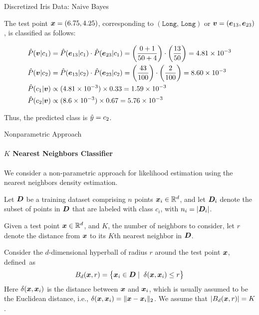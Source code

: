 \begin{frame}{Discretized Iris Data: Naive Bayes}

    The test point ${\boldsymbol x}=(6.75,4.25)$, corresponding to
    $(\texttt{Long, Long})$ or ${\boldsymbol v} = ({\boldsymbol e}_{13}, {\boldsymbol e}_{23})$,
    is classif\/{i}ed as follows:

    \begin{align*}
        \hat{P}({\boldsymbol v}|c_1) & = \hat{P}({\boldsymbol e}_{13}|c_1)\cdot \hat{P}({\boldsymbol e}_{23}|c_1)
        = \left({0+1\over 50+4}\right) \cdot \left({13 \over 50}\right) = 4.81
        \times 10^{-3}\\
        \hat{P}({\boldsymbol v}|c_2) & = \hat{P}({\boldsymbol e}_{13}|c_2)\cdot \hat{P}({\boldsymbol e}_{23}|c_2)
        = \left({43\over 100}\right) \cdot \left({2 \over 100}\right) = 8.60
        \times 10^{-3}\\
        \hat{P}(c_1|{\boldsymbol v}) & \propto (4.81 \times 10^{-3}) \times 0.33 =
        1.59 \times 10^{-3}\\
        \hat{P}(c_2|{\boldsymbol v}) & \propto (8.6 \times 10^{-3}) \times 0.67 =
        5.76 \times 10^{-3}
    \end{align*}

    Thus, the predicted class is $\hat{y} = c_2$.

\end{frame}


\begin{frame}{Nonparametric Approach}
\framesubtitle{$K$ Nearest Neighbors Classif\/{i}er}

We consider a
non-parametric approach for likelihood estimation 
using the nearest neighbors density estimation.

\medskip
Let ${\boldsymbol D}$ be a training dataset comprising $n$ points ${\boldsymbol x}_i \in
{\mathord{\mathbb R}}^d$, and let ${\boldsymbol D}_i$ denote the subset of points in ${\boldsymbol D}$ that are
labeled with class $c_i$, with $n_i = |{\boldsymbol D}_i|$.  

\medskip
Given a test point ${\boldsymbol x}
\in {\mathord{\mathbb R}}^d$, and $K$, the number of neighbors to consider, let $r$
denote the distance from ${\boldsymbol x}$ to its $K$th nearest neighbor in ${\boldsymbol D}$.

\medskip
Consider the $d$-dimensional hyperball of radius $r$ around the test
point ${\boldsymbol x}$, def\/{i}ned~as
\begin{align*}
  B_d({\boldsymbol x},r) = \bigl\{{\boldsymbol x}_i \in {\boldsymbol D} \mid
  \;\delta({\boldsymbol x},{\boldsymbol x}_i) \leq r\bigr\}
\end{align*}
Here $\delta({\boldsymbol x}, {\boldsymbol x}_i)$ is the distance between ${\boldsymbol x}$ and ${\boldsymbol x}_i$,
which is usually assumed to be the Euclidean distance, i.e., $\delta({\boldsymbol x},
{\boldsymbol x}_i) = \|{\boldsymbol x} - {\boldsymbol x}_i \|_2$.  We assume that $|B_d({\boldsymbol x},r)| = K$.
\end{frame}


